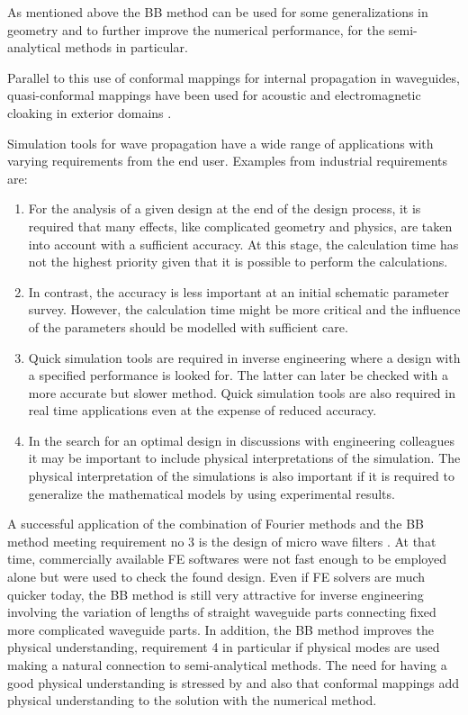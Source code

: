 \documentclass[numreferences]{kluwer}
\begin{document}
As mentioned above the BB method can be used for some generalizations in geometry and to further improve the
numerical performance, for the semi-analytical methods in particular.

Parallel to this use of conformal mappings for internal propagation in
waveguides, quasi-conformal mappings have been used for acoustic and
electromagnetic cloaking in exterior domains
\cite{pendryschurigsmith2006}.

Simulation tools for wave propagation have a wide range of
applications with varying requirements from the end user. Examples
from industrial requirements are:
\begin{enumerate}
\item For the analysis of a given design at the end of the design
  process, it is required that many effects, like complicated geometry
  and physics, are taken into account with a sufficient accuracy. At
  this stage, the calculation time has not the highest priority given
  that it is possible to perform the calculations.
\item In contrast, the accuracy is less important at an initial
  schematic parameter survey. However, the calculation time might be
  more critical and the influence of the parameters should be modelled
  with sufficient care.
\item Quick simulation tools are required in inverse engineering where
  a design with a specified performance is looked for. The latter can
  later be checked with a more accurate but slower method. Quick
  simulation tools are also required in real time applications even at
  the expense of reduced accuracy.
\item In the search for an optimal design in discussions with
  engineering colleagues it may be important to include physical
  interpretations of the simulation. The physical interpretation of
  the simulations is also important if it is required to generalize
  the mathematical models by using experimental results.

\end{enumerate}

A successful application of the combination of Fourier methods and the
BB method meeting requirement no 3 is the design of micro wave filters
\cite{bironilsson2005}. At that time, commercially available FE
softwares were not fast enough to be employed alone but were used to
check the found design. Even if FE solvers are much quicker today, the
BB method is still very attractive for inverse engineering involving
the variation of lengths of straight waveguide parts connecting fixed
more complicated waveguide parts. In addition, the BB method improves
the physical understanding, requirement 4 in particular if physical
modes are used making a natural connection to semi-analytical
methods. The need for having a good physical understanding is stressed
by \cite{nachbin+daSilvaSimoes:2012} and also that conformal mappings
add physical understanding to the solution with the numerical method.
\end{document}
